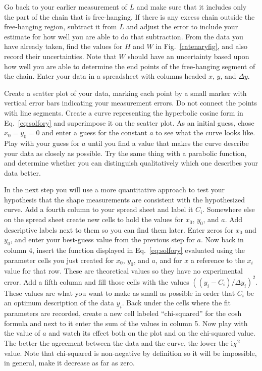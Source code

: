 \documentclass{revtex4}
\begin{document}
Go back to your earlier measurement of $L$ and make sure that it includes
only the part of the chain that is free-hanging. If there is any excess chain
outside the free-hanging region, subtract it from $L$ and adjust the error to
include your estimate for how well you are able to do that subtraction. From
the data you have already taken, find the values for $H$ and $W$ in
Fig.~\ref{catenaryfig}, and also record their uncertainties. Note that $W$
should have an uncertainty based upon how well you are able to determine the
end points of the free-hanging segment of the chain.  Enter your data in a
spreadsheet with columns headed $x$, $y$, and $\Delta y$.  

Create a scatter plot of your data, marking each point by a small marker with
vertical error bars indicating your measurement errors. Do not connect the
points with line segments. Create a curve representing the hyperbolic cosine
form in Eq.~\ref{eq:solfory} and superimpose it on the scatter plot. As an
initial guess, chose $x_0 = y_0 = 0$ and enter a guess for the constant $a$
to see what the curve looks like. Play with your guess for $a$ until you find
a value that makes the curve describe your data as closely as possible. Try
the same thing with a parabolic function, and determine whether you can
distinguish qualitatively which one describes your data better.

In the next step you will use a more quantitative approach to test your
hypothesis that the shape measurements are consistent with the hypothesized
curve. Add a fourth column to your spread sheet and label it $C_i$.  Somewhere
else on the spread sheet create new cells to hold the values for $x_0$, $y_0$,
and $a$. Add descriptive labels next to them so you can find them later.
Enter zeros for $x_0$ and $y_0$, and enter your best-guess value from the
previous step for $a$. Now back in column 4, insert the function displayed
in Eq.~\ref{eq:solfory} evaluated using the parameter cells you just created for
$x_0$, $y_0$, and $a$, and for $x$ a reference to the $x_i$ value for that
row. These are theoretical values so they have no experimental error.
Add a fifth column and fill those cells with the values
$((y_i - C_i)/\Delta y_i)^2$. These values are what you want to make as
small as possible in order that $C_i$ be an optimum description of the data
$y_i$. Back under the cells where the fit parameters are recorded, create
a new cell labeled ``chi-squared'' for the cosh formula and next to it
enter the sum of the values in column 5. Now play with the value of $a$
and watch its effect both on the plot and on the chi-squared value.
The better the agreement between the data and the curve, the lower the
i$\chi^2$ value.  Note that chi-squared is non-negative by definition so
it will be impossible, in general,  make it decrease as far as zero.
\end{document}
